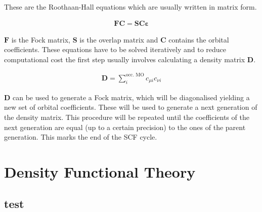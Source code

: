 These are the Roothaan-Hall equations which are usually written in matrix form.

\begin{align}
    \mathbf{FC}=\mathbf{SC\varepsilon}
\end{align}

$\mathbf{F}$ is the Fock matrix, $\mathbf{S}$ is the overlap matrix and
$\mathbf{C}$ contains the orbital coefficients. These equations have to be solved iteratively and to reduce computational cost the first step usually involves calculating a density matrix $\mathbf{D}$.

\begin{align}
    \mathbf{D}=\sum_{i}^\text{occ. MO} c_{\mu i}c_{\nu i}
\end{align}

$\mathbf{D}$ can be used to generate a Fock matrix, which will be diagonalised
yielding a new set of orbital coefficients. These will be used to generate a
next generation of the density matrix. This procedure will be repeated until
the coefficients of the next generation are equal (up to a certain precision)
to the ones of the parent generation. This marks the end of the \ac{SCF} cycle.

\section{Density Functional Theory}
\label{sec:dft}

\subsection{test}
